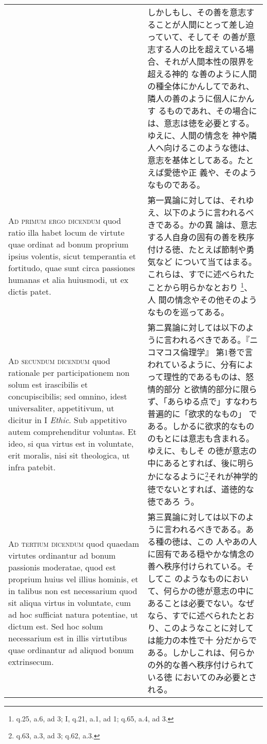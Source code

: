 \documentclass[10pt]{jsarticle}
\begin{document}
\begin{longtable}{p{21em}p{21em}}
&

しかしもし、その善を意志することが人間にとって差し迫っていて、そしてそ
の善が意志する人の比を超えている場合、それが人間本性の限界を超える神的
な善のように人間の種全体にかんしてであれ、隣人の善のように個人にかんす
るものであれ、その場合には、意志は徳を必要とする。ゆえに、人間の情念を
神や隣人へ向けるこのような徳は、意志を基体としてある。たとえば愛徳や正
義や、そのようなものである。
 
\\

{\scshape Ad primum ergo dicendum} quod ratio illa habet locum de
virtute quae ordinat ad bonum proprium ipsius volentis, sicut
temperantia et fortitudo, quae sunt circa passiones humanas et alia
huiusmodi, ut ex dictis patet.

&

 第一異論に対しては、それゆえ、以下のように言われるべきである。かの異
 論は、意志する人自身の固有の善を秩序付ける徳、たとえば節制や勇気など
 について当てはまる。これらは、すでに述べられたことから明らかなとおり
 \footnote{q.25, a.6, ad 3; I, q.21, a.1, ad 1; q.65, a.4, ad 3.}、人
 間の情念やその他そのようなものを巡ってある。
 
\\

{\scshape Ad secundum dicendum} quod rationale per participationem non
solum est irascibilis et concupiscibilis; sed omnino, idest
universaliter, appetitivum, ut dicitur in I {\itshape Ethic}. Sub
appetitivo autem comprehenditur voluntas. Et ideo, si qua virtus est
in voluntate, erit moralis, nisi sit theologica, ut infra patebit.

&

 第二異論に対しては以下のように言われるべきである。『ニコマコス倫理学』
 第1巻で言われているように、分有によって理性的であるものは、怒情的部分
 と欲情的部分に限らず、「あらゆる点で」すなわち普遍的に「欲求的なもの」
 である。しかるに欲求的なもののもとには意志も含まれる。ゆえに、もしそ
 の徳が意志の中にあるとすれば、後に明らかになるように\footnote{q.63,
 a.3, ad 3; q.62, a.3.}それが神学的徳でないとすれば、道徳的な徳であろ
 う。
 
\\

{\scshape Ad tertium dicendum} quod quaedam virtutes ordinantur ad
bonum passionis moderatae, quod est proprium huius vel illius hominis,
et in talibus non est necessarium quod sit aliqua virtus in voluntate,
cum ad hoc sufficiat natura potentiae, ut dictum est. Sed hoc solum
necessarium est in illis virtutibus quae ordinantur ad aliquod bonum
extrinsecum.

&

 第三異論に対しては以下のように言われるべきである。ある種の徳は、この
 人やあの人に固有である穏やかな情念の善へ秩序付けられている。そしてこ
 のようなものにおいて、何らかの徳が意志の中にあることは必要でない。なぜ
 なら、すでに述べられたとおり、このようなことに対しては能力の本性で十
 分だからである。しかしこれは、何らかの外的な善へ秩序付けられている徳
 においてのみ必要とされる。

\end{longtable}
\end{document}
